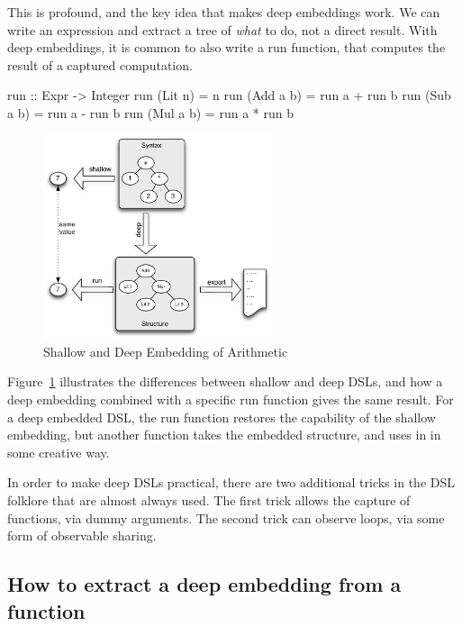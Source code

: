 \documentclass[11pt]{article}
\begin{document}
This is profound, and the key idea that makes deep embeddings work. We can write
an expression and extract a tree of {\em what\/} to do, not a direct result.
With deep embeddings, it is common to also
write a run function, that computes the result
of a captured computation.
\begin{Code}
run :: Expr -> Integer
run (Lit n)   = n
run (Add a b) = run a + run b
run (Sub a b) = run a - run b
run (Mul a b) = run a * run b
\end{Code}

\begin{figure}[!t]
  \centering        
  \includegraphics[width=0.6\textwidth]{images/DeepEmbedding.pdf}
  \caption{Shallow and Deep Embedding of Arithmetic}
  \label{fig:deep-dsls}
\end{figure}

Figure~\ref{fig:deep-dsls} illustrates the differences between shallow and deep DSLs,
and how a deep embedding combined with a specific run function gives the same result.
For a deep embedded DSL, the run function restores the capability of the shallow
embedding, but another function takes the embedded structure, and uses in in some creative way. 

In order to make deep DSLs practical, there are two additional tricks in the DSL folklore that are almost
always used.
The first trick allows the capture of functions, via dummy arguments. The second trick can observe loops,
via some form of observable sharing. 

\subsection{How to extract a deep embedding from a function}
\end{document}
